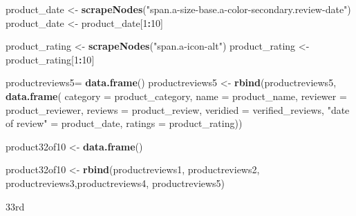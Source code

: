 \documentclass[
]{article}
\newenvironment{Shaded}{\begin{snugshade}}{\end{snugshade}}
\newcommand{\AttributeTok}[1]{\textcolor[rgb]{0.13,0.29,0.53}{#1}}
\newcommand{\DecValTok}[1]{\textcolor[rgb]{0.00,0.00,0.81}{#1}}
\newcommand{\FunctionTok}[1]{\textcolor[rgb]{0.13,0.29,0.53}{\textbf{#1}}}
\newcommand{\NormalTok}[1]{#1}
\newcommand{\OtherTok}[1]{\textcolor[rgb]{0.56,0.35,0.01}{#1}}
\newcommand{\SpecialCharTok}[1]{\textcolor[rgb]{0.81,0.36,0.00}{\textbf{#1}}}
\newcommand{\StringTok}[1]{\textcolor[rgb]{0.31,0.60,0.02}{#1}}
\begin{document}
\begin{Shaded}
\begin{Highlighting}[]
\NormalTok{  product\_date }\OtherTok{\textless{}{-}} \FunctionTok{scrapeNodes}\NormalTok{(}\StringTok{"span.a{-}size{-}base.a{-}color{-}secondary.review{-}date"}\NormalTok{)}
\NormalTok{  product\_date }\OtherTok{\textless{}{-}}\NormalTok{ product\_date[}\DecValTok{1}\SpecialCharTok{:}\DecValTok{10}\NormalTok{]}
  
\NormalTok{  product\_rating }\OtherTok{\textless{}{-}} \FunctionTok{scrapeNodes}\NormalTok{(}\StringTok{"span.a{-}icon{-}alt"}\NormalTok{)}
\NormalTok{  product\_rating }\OtherTok{\textless{}{-}}\NormalTok{ product\_rating[}\DecValTok{1}\SpecialCharTok{:}\DecValTok{10}\NormalTok{]}
  
\NormalTok{  productreviews5}\OtherTok{=} \FunctionTok{data.frame}\NormalTok{()}
\NormalTok{  productreviews5 }\OtherTok{\textless{}{-}} \FunctionTok{rbind}\NormalTok{(productreviews5, }\FunctionTok{data.frame}\NormalTok{(}
                      \AttributeTok{category =}\NormalTok{ product\_category,}
                      \AttributeTok{name =}\NormalTok{ product\_name,}
                      \AttributeTok{reviewer =}\NormalTok{ product\_reviewer,}
                      \AttributeTok{reviews =}\NormalTok{ product\_review,}
                      \AttributeTok{veridied =}\NormalTok{ verified\_reviews,}
                      \StringTok{"date of review"} \OtherTok{=}\NormalTok{ product\_date,}
                      \AttributeTok{ratings =}\NormalTok{ product\_rating))}
  
\NormalTok{  product32of10 }\OtherTok{\textless{}{-}} \FunctionTok{data.frame}\NormalTok{()}
  
\NormalTok{  product32of10 }\OtherTok{\textless{}{-}} \FunctionTok{rbind}\NormalTok{(productreviews1, productreviews2, productreviews3,productreviews4, productreviews5)}
\end{Highlighting}
\end{Shaded}

33rd
\end{document}
